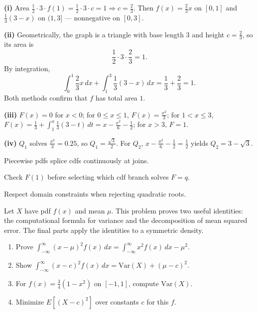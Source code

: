 \begin{solution}
\textbf{(i)} Area $\tfrac12\cdot 3\cdot f(1)=\tfrac12\cdot 3\cdot c=1\Rightarrow c=\frac{2}{3}$. Then $f(x)=\frac{2}{3}x$ on $[0,1]$ and $\frac{1}{3}(3-x)$ on $(1,3]$ --- nonnegative on $[0,3]$.

\textbf{(ii)} Geometrically, the graph is a triangle with base length $3$ and height $c=\frac23$, so its area is
\[
\frac12\cdot3\cdot\frac23=1.
\]
By integration,
\[
\int_0^1 \frac23x\,dx+\int_1^3 \frac13(3-x)\,dx
=\frac13+\frac23=1.
\]
Both methods confirm that $f$ has total area $1$.

\textbf{(iii)} $F(x)=0$ for $x<0$; for $0\le x\le 1$, $F(x)=\frac{x^{2}}{3}$; for $1<x\le 3$, $F(x)=\frac{1}{3}+\int_{1}^{x}\frac{1}{3}(3-t)\,dt=x-\frac{x^{2}}{6}-\frac12$; for $x>3$, $F=1$.

\textbf{(iv)} $Q_{1}$ solves $\frac{x^{2}}{3}=0{.}25$, so $Q_{1}=\frac{\sqrt{3}}{2}$. For $Q_{2}$, $x-\frac{x^{2}}{6}-\frac12=\frac12$ yields $Q_{2}=3-\sqrt{3}$.
\end{solution}

\begin{takeaways}
\item Piecewise pdfs splice cdfs continuously at joins.
\item Check $F(1)$ before selecting which cdf branch solves $F=q$.
\item Respect domain constraints when rejecting quadratic roots.
\end{takeaways}

\begin{problem}
Let $X$ have pdf $f(x)$ and mean $\mu$. This problem proves two useful identities: the computational formula for variance and the decomposition of mean squared error. The final parts apply the identities to a symmetric density.
\begin{enumerate}[label=\textbf{(\roman*)}]
  \item Prove $\displaystyle\int_{-\infty}^{\infty}(x-\mu)^{2}f(x)\,dx=\int_{-\infty}^{\infty}x^{2}f(x)\,dx-\mu^{2}$.
  \item Show $\displaystyle\int_{-\infty}^{\infty}(x-c)^{2}f(x)\,dx=\mathrm{Var}(X)+(\mu-c)^{2}$.
  \item For $f(x)=\frac{3}{4}(1-x^{2})$ on $[-1,1]$, compute $\mathrm{Var}(X)$.
  \item Minimize $E[(X-c)^{2}]$ over constants $c$ for this $f$.
\end{enumerate}
\end{problem}

